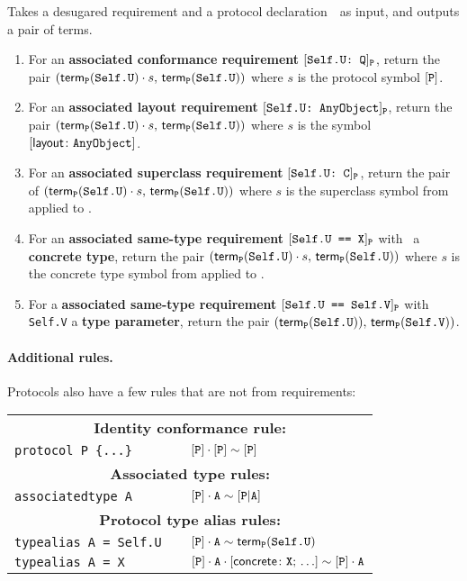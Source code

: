 \documentclass[../generics]{subfiles}
\begin{document}
\begin{algorithm}\label{build rule protocol}
Takes a desugared requirement and a protocol declaration~\tP\ as input, and outputs a pair of terms.
\begin{enumerate}
\item For an \textbf{associated conformance requirement} $[\texttt{Self.U:~Q}]_{\texttt{P}}$, return the pair $(\mathsf{term}_{\texttt{P}}(\texttt{Self.U})\cdot s,\,\mathsf{term}_{\texttt{P}}(\texttt{Self.U}))$ where $s$ is the protocol symbol $[\texttt{P}]$.
\item For an \textbf{associated layout requirement} $[\texttt{Self.U:~AnyObject}]_{\texttt{P}}$, return the pair $(\mathsf{term}_{\texttt{P}}(\texttt{Self.U})\cdot s,\,\mathsf{term}_{\texttt{P}}(\texttt{Self.U}))$ where $s$ is the symbol $[\mathsf{layout}\colon\texttt{AnyObject}]$.
\item For an \textbf{associated superclass requirement} $[\texttt{Self.U:~C}]_{\texttt{P}}$, return the pair of $(\mathsf{term}_{\texttt{P}}(\texttt{Self.U})\cdot s,\,\mathsf{term}_{\texttt{P}}(\texttt{Self.U}))$ where $s$ is the superclass symbol from  applied to \tC.
\item For an \textbf{associated same-type requirement} $[\texttt{Self.U == X}]_{\texttt{P}}$ with \tX\ a \textbf{concrete type}, return the pair $(\mathsf{term}_{\texttt{P}}(\texttt{Self.U})\cdot s,\,\mathsf{term}_{\texttt{P}}(\texttt{Self.U}))$ where $s$ is the concrete type symbol from  applied to \tX.
\item For a \textbf{associated same-type requirement} $[\texttt{Self.U == Self.V}]_{\texttt{P}}$ with \texttt{Self.V} a \textbf{type parameter}, return the pair $(\mathsf{term}_{\texttt{P}}(\texttt{Self.U})),\, \mathsf{term}_{\texttt{P}}(\texttt{Self.V}))$.
\end{enumerate}
\end{algorithm}

\paragraph{Additional rules.} Protocols also have a few rules that are not from requirements:
\begin{center}
\begin{tabular}{lll}
\toprule
\multicolumn{3}{c}{\textbf{Identity conformance rule:}}\\
\verb|protocol P {...}|&& $[\texttt{P}]\cdot[\texttt{P}] \sim [\texttt{P}]$\\
\midrule
\multicolumn{3}{c}{\textbf{Associated type rules:}}\\
\verb|associatedtype A|&& $[\texttt{P}]\cdot\texttt{A} \sim [\texttt{P}|\texttt{A}]$\\
\midrule
\multicolumn{3}{c}{\textbf{Protocol type alias rules:}}\\
\verb|typealias A = Self.U|&& $[\texttt{P}]\cdot\texttt{A} \sim \mathsf{term}_{\texttt{P}}(\texttt{Self.U})$\\
\verb|typealias A = X|&& $[\texttt{P}]\cdot\texttt{A} \cdot [\mathsf{concrete}\colon \texttt{X};\, \ldots] \sim [\texttt{P}]\cdot\texttt{A}$\\
\bottomrule
\end{tabular}
\end{center}
\end{document}
